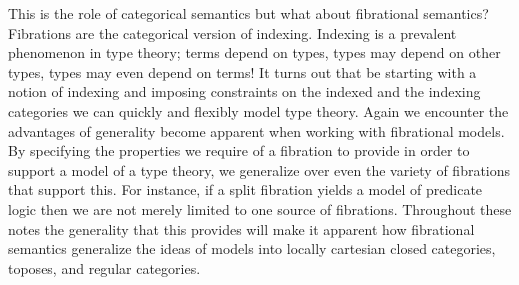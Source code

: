 This is the role of categorical semantics but what about fibrational
semantics? Fibrations are the categorical version of
indexing. Indexing is a prevalent phenomenon in type theory; terms
depend on types, types may depend on other types, types may even
depend on terms! It turns out that be starting with a notion of
indexing and imposing constraints on the indexed and the indexing
categories we can quickly and flexibly model type theory. Again we
encounter the advantages of generality become apparent when working
with fibrational models. By specifying the properties we require of a
fibration to provide in order to support a model of a type theory, we
generalize over even the variety of fibrations that support this. For
instance, if a split fibration yields a model of predicate logic then
we are not merely limited to one source of fibrations. Throughout
these notes the generality that this provides will make it apparent
how fibrational semantics generalize the ideas of models into locally
cartesian closed categories, toposes, and regular categories.
